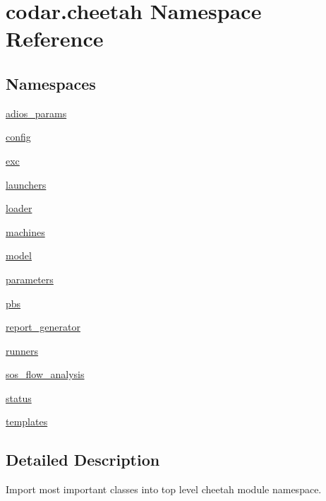 \hypertarget{namespacecodar_1_1cheetah}{}\section{codar.\+cheetah Namespace Reference}
\label{namespacecodar_1_1cheetah}
\subsection*{Namespaces}
\begin{DoxyCompactItemize}
\item 
 \hyperlink{namespacecodar_1_1cheetah_1_1adios__params}{adios\+\_\+params}
\item 
 \hyperlink{namespacecodar_1_1cheetah_1_1config}{config}
\item 
 \hyperlink{namespacecodar_1_1cheetah_1_1exc}{exc}
\item 
 \hyperlink{namespacecodar_1_1cheetah_1_1launchers}{launchers}
\item 
 \hyperlink{namespacecodar_1_1cheetah_1_1loader}{loader}
\item 
 \hyperlink{namespacecodar_1_1cheetah_1_1machines}{machines}
\item 
 \hyperlink{namespacecodar_1_1cheetah_1_1model}{model}
\item 
 \hyperlink{namespacecodar_1_1cheetah_1_1parameters}{parameters}
\item 
 \hyperlink{namespacecodar_1_1cheetah_1_1pbs}{pbs}
\item 
 \hyperlink{namespacecodar_1_1cheetah_1_1report__generator}{report\+\_\+generator}
\item 
 \hyperlink{namespacecodar_1_1cheetah_1_1runners}{runners}
\item 
 \hyperlink{namespacecodar_1_1cheetah_1_1sos__flow__analysis}{sos\+\_\+flow\+\_\+analysis}
\item 
 \hyperlink{namespacecodar_1_1cheetah_1_1status}{status}
\item 
 \hyperlink{namespacecodar_1_1cheetah_1_1templates}{templates}
\end{DoxyCompactItemize}


\subsection{Detailed Description}
\begin{DoxyVerb}Import most important classes into top level cheetah module namespace.
\end{DoxyVerb}
 